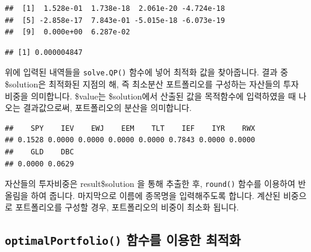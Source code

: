 \documentclass[12pt,]{book}
\newenvironment{Shaded}{\begin{snugshade}}{\end{snugshade}}
\newcommand{\DecValTok}[1]{\textcolor[rgb]{0.00,0.00,0.81}{#1}}
\newcommand{\KeywordTok}[1]{\textcolor[rgb]{0.13,0.29,0.53}{\textbf{#1}}}
\newcommand{\NormalTok}[1]{#1}
\newcommand{\OperatorTok}[1]{\textcolor[rgb]{0.81,0.36,0.00}{\textbf{#1}}}
\newcommand{\StringTok}[1]{\textcolor[rgb]{0.31,0.60,0.02}{#1}}
\begin{document}
\begin{verbatim}
##  [1]  1.528e-01  1.738e-18  2.061e-20 -4.724e-18
##  [5] -2.858e-17  7.843e-01 -5.015e-18 -6.073e-19
##  [9]  0.000e+00  6.287e-02
\end{verbatim}

\begin{Shaded}
\end{Shaded}

\begin{verbatim}
## [1] 0.000004847
\end{verbatim}

위에 입력된 내역들을 \texttt{solve.QP()} 함수에 넣어 최적화 값을 찾아줍니다. 결과 중 \$solution은 최적화된 지점의 해, 즉 최소분산 포트폴리오를 구성하는 자산들의 투자 비중을 의미합니다. \$value는 \$solution에서 산출된 값을 목적함수에 입력하였을 때 나오는 결과값으로써, 포트폴리오의 분산을 의미합니다.

\begin{Shaded}
\end{Shaded}

\begin{verbatim}
##    SPY    IEV    EWJ    EEM    TLT    IEF    IYR    RWX 
## 0.1528 0.0000 0.0000 0.0000 0.0000 0.7843 0.0000 0.0000 
##    GLD    DBC 
## 0.0000 0.0629
\end{verbatim}

자산들의 투자비중은 result\$solution 을 통해 추출한 후, \texttt{round()} 함수를 이용하여 반올림을 하여 줍니다. 마지막으로 이름에 종목명을 입력해주도록 합니다. 계산된 비중으로 포트폴리오를 구성할 경우, 포트폴리오의 비중이 최소화 됩니다.

\hypertarget{optimalportfolio---}{%
\subsection{\texorpdfstring{\texttt{optimalPortfolio()} 함수를 이용한 최적화}{optimalPortfolio() 함수를 이용한 최적화}}\label{optimalportfolio---}}
\end{document}
